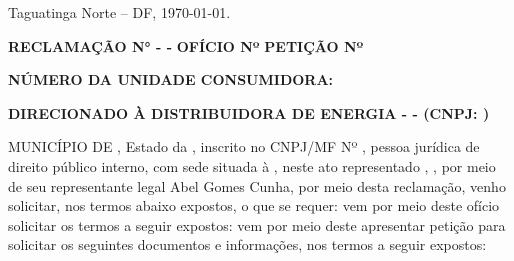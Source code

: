 \begin{flushright}
Taguatinga Norte – DF, \today.
\end{flushright}

\ifnum{}
\textbf{RECLAMAÇÃO N° \numReclamacao{} - \nomeMunicipioMaisculo{} - \siglaEstado{}}
\else
\ifnum{}
\textbf{OFÍCIO Nº \numReclamacao{}}
\else
\textbf{PETIÇÃO Nº \numReclamacao{}}
\fi
\fi

\ifnum{}
\textbf{NÚMERO DA UNIDADE CONSUMIDORA: \unidadeConsumidora{}}
\fi

\textbf{DIRECIONADO À DISTRIBUIDORA DE ENERGIA - \nomeConcessionaria{} - (CNPJ: \cnpjConcessionaria{})} 

\vspace{0.5cm}

MUNICÍPIO DE \nomeMunicipioMaisculo{}, Estado da \nomeEstado{}, inscrito no CNPJ/MF Nº \cnpjMunicipio{}, pessoa jurídica de direito público interno, com sede situada à \sedePrefeitura{}, neste ato representado \generoPrefeitura{}, \nomePrefeito{}, por meio de seu representante legal Abel Gomes Cunha,
\ifnum{}
por meio desta reclamação, venho solicitar, nos termos abaixo expostos, o que se requer:
\else
\ifnum{}
vem por meio deste ofício solicitar os termos a seguir expostos:
\else
vem por meio deste apresentar petição para solicitar os seguintes documentos e informações, nos termos a seguir expostos:
\fi
\fi
